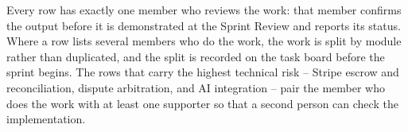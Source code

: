 \endgroup

\normalsize

Every row has exactly one member who reviews the work: that member confirms the output before it is demonstrated at the Sprint Review and reports its status. Where a row lists several members who do the work, the work is split by module rather than duplicated, and the split is recorded on the task board before the sprint begins. The rows that carry the highest technical risk -- Stripe escrow and reconciliation, dispute arbitration, and AI integration -- pair the member who does the work with at least one supporter so that a second person can check the implementation.
